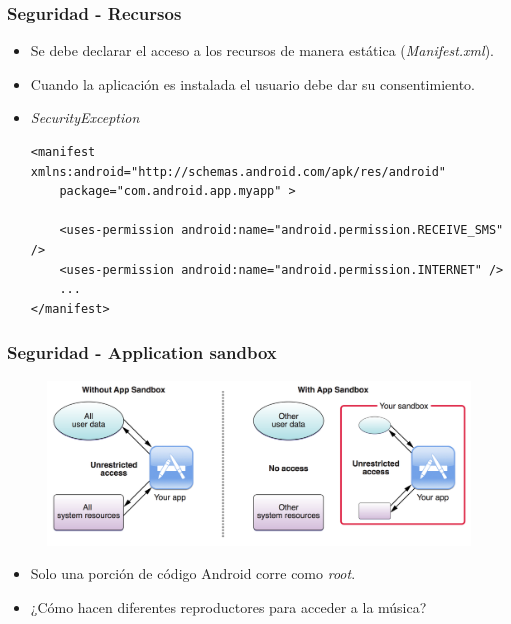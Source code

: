\begin{frame}[fragile]
  \frametitle{Seguridad - Recursos}
  \begin{itemize}
    \item Se debe declarar el acceso a los recursos de manera estática (\textit{Manifest.xml}).
    
    \item Cuando la aplicación es instalada el usuario debe dar su consentimiento.
    
    \item \textit{SecurityException}
    \begin{lstlisting}
<manifest xmlns:android="http://schemas.android.com/apk/res/android"
    package="com.android.app.myapp" >

    <uses-permission android:name="android.permission.RECEIVE_SMS" />
    <uses-permission android:name="android.permission.INTERNET" />
    ...
</manifest>
    \end{lstlisting}    
  \end{itemize}
\end{frame}

\begin{frame}
  \frametitle{Seguridad - Application sandbox}
  \begin{figure}
    \centering
    \includegraphics[scale=0.2]{images/sandbox.png}
  \end{figure}
  
  \begin{itemize}
      \item Solo una porción de código Android corre como \textit{root}.
      
      \item ¿Cómo hacen diferentes reproductores para acceder a la música?
  \end{itemize}
\end{frame}

